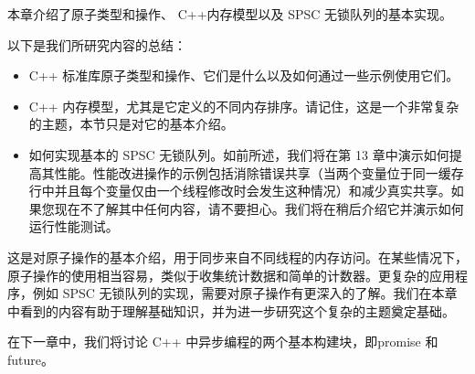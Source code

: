 本章介绍了原子类型和操作、 C++内存模型以及 SPSC 无锁队列的基本实现。

以下是我们所研究内容的总结：

\begin{itemize}
\item
C++ 标准库原子类型和操作、它们是什么以及如何通过一些示例使用它们。

\item
C++ 内存模型，尤其是它定义的不同内存排序。请记住，这是一个非常复杂的主题，本节只是对它的基本介绍。

\item
如何实现基本的 SPSC 无锁队列。如前所述，我们将在第 13 章中演示如何提高其性能。性能改进操作的示例包括消除错误共享（当两个变量位于同一缓存行中并且每个变量仅由一个线程修改时会发生这种情况）和减少真实共享。如果您现在不了解其中任何内容，请不要担心。我们将在稍后介绍它并演示如何运行性能测试。
\end{itemize}

这是对原子操作的基本介绍，用于同步来自不同线程的内存访问。在某些情况下，原子操作的使用相当容易，类似于收集统计数据和简单的计数器。更复杂的应用程序，例如 SPSC 无锁队列的实现，需要对原子操作有更深入的了解。我们在本章中看到的内容有助于理解基础知识，并为进一步研究这个复杂的主题奠定基础。

在下一章中，我们将讨论 C++ 中异步编程的两个基本构建块，即promise 和future。